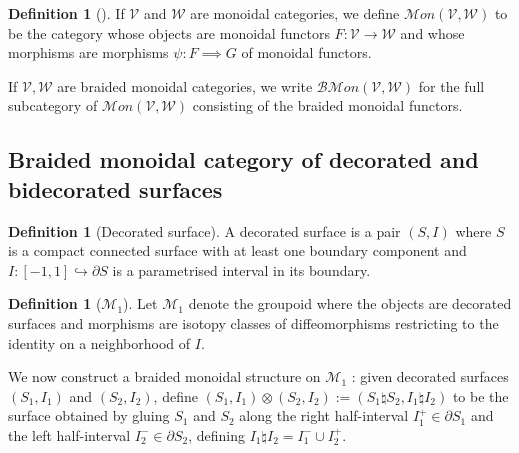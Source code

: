 \documentclass[reqno]{amsart}
\theoremstyle{definition}
\newtheorem{definition}[theorem]{Definition}
\theoremstyle{remark}
\newcommand{\Mon}{{\mathcal{M}}on}
\newcommand{\BMon}{{\mathcal{B}\mathcal{M}}on}
\begin{document}
     \begin{definition}[]
         If $\mathcal{V}$ and $\mathcal{W}$ are monoidal categories,
         we define $\Mon \left( 
         \mathcal{V}, \mathcal{W}\right) $ to be the
         category whose objects are
         monoidal functors $F \colon \mathcal{V} \to 
         \mathcal{W}$ and whose morphisms are
         morphisms $\psi \colon F \implies G$ of
         monoidal functors.

         If $\mathcal{V}, \mathcal{W}$ are braided monoidal
         categories, we write
         $\BMon \left( \mathcal{V}, \mathcal{W} \right) $ for
         the full subcategory of
         $\Mon \left( \mathcal{V}, \mathcal{W} \right) $ consisting
         of the braided monoidal functors.
     \end{definition}




   \subsection{Braided monoidal category of decorated and
   bidecorated surfaces}

   \begin{definition}[Decorated surface]
       A decorated surface is a pair
       $(S,I)$ where $S$ is a compact connected
       surface with at least one boundary component
       and $I \colon \left[ -1,1 \right] 
       \hookrightarrow \partial S$ is a parametrised interval
       in its boundary.
   \end{definition}

   \begin{definition}[$\mathcal{M}_1$]
       Let $\mathcal{M}_1$ denote the groupoid where
       the objects are
       decorated surfaces and
       morphisms are isotopy classes of diffeomorphisms
       restricting to the identity on a neighborhood
       of $I$.
   \end{definition}

   We now construct a braided monoidal structure on
   $\mathcal{M}_1$ : given decorated surfaces
   $\left( S_1, I_1 \right) $ and
   $\left( S_2,I_2 \right) $, define
   $\left( S_1, I_1 \right) 
   \otimes \left( S_2, I_2 \right) 
   := \left( S_1 \natural S_2, I_1 \natural I_2 \right) $ to be
   the surface obtained by gluing
   $S_1$ and $S_2$ along the right half-interval
   $I_1^{+} \in \partial S_1$ and the
   left half-interval $I_2^{-} \in \partial S_2$, defining
   $I_1 \natural I_2 = I_1^{-} \cup I_2^{+}$.
\end{document}
